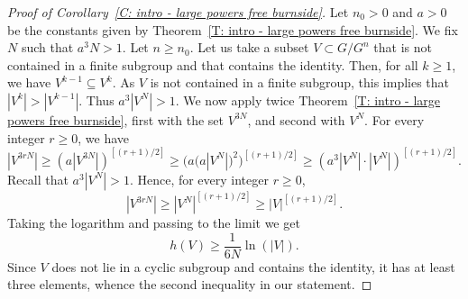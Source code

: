 \documentclass[JEP,XML,SOM,Unicode, NoEqCountersInSection,published]{cedram}
\theoremstyle{plain}
\theoremstyle{definition}
\begin{document}
\begin{proof}[Proof of Corollary~\ref{C: intro - large powers free burnside}]
Let $n_0>0$ and $a>0$ be the constants given by Theorem~\ref{T: intro - large powers free burnside}.
We fix $N$ such that $a^3N>1$.
Let $n\geqslant n_0$.
Let us take a subset $V\subset G/G^n$ that is not contained in a finite subgroup and that contains the identity. Then, for all $k\geqslant 1$, we have $V^{k-1} \subseteq V^k$. As $V$ is not contained in a finite subgroup, this implies that $|V^k|>|V^{k-1}|$. Thus $a^3|V^ N|>1$.
We now apply twice Theorem~\ref{T: intro - large powers free burnside},
first with the set $V^{3N}$, and second with $V^N$.
For every integer $r \geq 0$, we have
\begin{equation*}
|V^{3rN}|
\geq \left(a |V^{3N}| \right)^{[(r+1)/2]}
\geq \bigl(a \bigl(a|V^N|\bigr)^2 \bigr)^{[(r+1)/2]}
\geq \left(a^3|V^N| \cdot |V^N| \right)^{[(r+1)/2]}.
\end{equation*}
Recall that $a^3|V^ N|>1$.
Hence, for every integer $r \geq 0$,
\begin{equation*}
|V^{3rN}|
\geq |V^N| ^{[(r+1)/2]}
\geq |V|^{[(r+1)/2]}.
\end{equation*}
Taking the logarithm and passing to the limit we get
\begin{equation*}
h(V)
\geq \frac 1{6N} \ln(|V|).
\end{equation*}
Since $V$ does not lie in a cyclic subgroup and contains the identity, it has at least three elements, whence the second inequality in our statement.
\end{proof}

\backmatter


\end{document}

